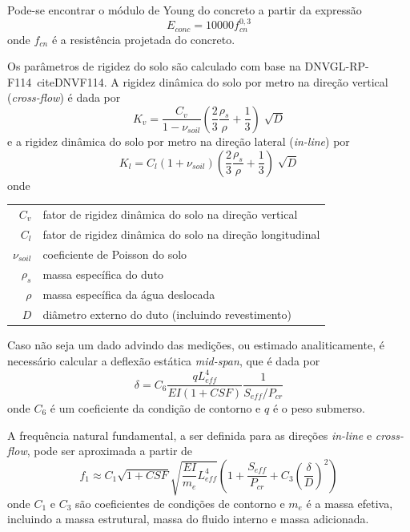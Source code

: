 Pode-se encontrar o módulo de Young do concreto a partir da expressão
\begin{equation}
\label{eq:jdsn-Econc}
E_\mathit{conc} = 10000 f_\mathit{cn}^{0,3}
\end{equation}
onde $f_\mathit{cn}$ é a resistência projetada do concreto.

Os parâmetros de rigidez do solo são calculado com base na DNVGL-RP-F114~cite{DNVF114}.
A rigidez dinâmica do solo por metro na direção vertical (\textit{cross-flow}) é dada por
\begin{equation}
\label{eq:jdsn-Kv}
K_v = \frac{C_v}{1 - \nu_\mathit{soil}}\left(\frac{2}{3}\frac{\rho_s}{\rho}+\frac{1}{3}\right)\sqrt[]{D}
\end{equation}
e a rigidez dinâmica do solo por metro na direção lateral (\textit{in-line}) por
\begin{equation}
\label{eq:jdsn-Kl}
K_l = C_l (1+\nu_\mathit{soil})\left(\frac{2}{3}\frac{\rho_s}{\rho}+ \frac{1}{3}\right)\sqrt[]{D}
\end{equation}
onde

\begin{tabular}{rl}
	$C_v$               & fator de rigidez dinâmica do solo na direção vertical\\
	$C_l$               & fator de rigidez dinâmica do solo na direção longitudinal\\
	$\nu_\mathit{soil}$ & coeficiente de Poisson do solo\\
	$\rho_s$            & massa específica do duto\\
	$\rho$              & massa específica da água deslocada\\
	$D$                 & diâmetro externo do duto (incluindo revestimento)
\end{tabular}

Caso não seja um dado advindo das medições, ou estimado analiticamente, é necessário calcular a deflexão estática \textit{mid-span}, que é dada por
\begin{equation}
\label{eq:jdsn-deflex}
\delta = C_6 \frac{q L_\mathit{eff}^4}{\mathit{EI} (1 + \mathit{CSF})} \frac{1}{S_\mathit{eff}/P_\mathit{cr}}
\end{equation}
onde $C_6$ é um coeficiente da condição de contorno e $q$ é o peso submerso.

A frequência natural fundamental, a ser definida para as direções \textit{in-line} e \textit{cross-flow}, pode ser aproximada a partir de
\begin{equation}
\label{eq:jdsn-f1}
f_1 \approx C_1 \sqrt{1 + \mathit{CSF}}\sqrt{\frac{\mathit{EI}}{m_e} L_\mathit{eff}^4} \left(1 + \frac{S_\mathit{eff}}{P_\mathit{cr}} + C_3 \left(\frac{\delta}{D}\right)^2\right)
\end{equation}
onde $C_1$ e $C_3$ são coeficientes de condições de contorno e $m_e$ é a massa efetiva, incluindo a massa estrutural, massa do fluido interno e massa adicionada.

